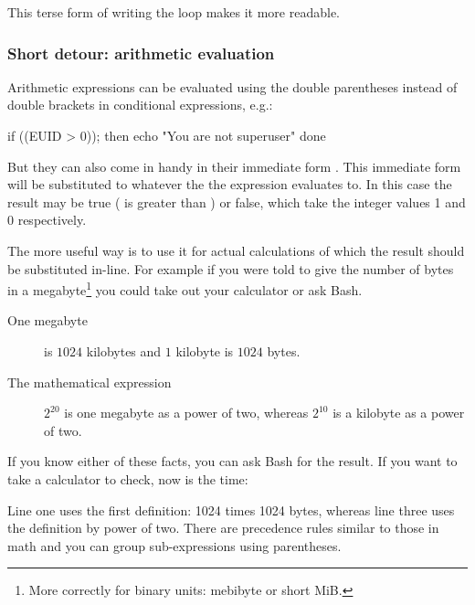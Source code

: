 \documentclass{olli-handout}
\begin{document}
This terse form of writing the loop makes it more readable.

\subsubsection{Short detour: arithmetic evaluation}

\begin{refmanbash}
\end{refmanbash}

Arithmetic expressions can be evaluated using the double parentheses instead of double brackets in conditional expressions, e.g.:

\begin{lstbash}
if ((EUID > 0)); then
  echo "You are not superuser"
done
\end{lstbash}

But they can also come in handy in their immediate form . This immediate form will be substituted to whatever the the expression evaluates to. In this case the result may be true ( is greater than ) or false, which take the integer values 1 and 0 respectively.

The more useful way is to use it for actual calculations of which the result should be substituted in-line. For example if you were told to give the number of bytes in a megabyte\footnote{More correctly for binary units: mebibyte or short MiB.} you could take out your calculator or ask Bash.

\begin{description}
    \item[One megabyte] is $1024$ kilobytes and $1$ kilobyte is $1024$ bytes.
    \item[The mathematical expression] $2^{20}$ is one megabyte as a power of two, whereas $2^{10}$ is a kilobyte as a power of two.
\end{description}

If you know either of these facts, you can ask Bash for the result. If you want to take a calculator to check, now is the time:


Line one uses the first definition: 1024 times 1024 bytes, whereas line three uses the definition by power of two. There are precedence rules similar to those in math and you can group sub-expressions using parentheses.
\end{document}
